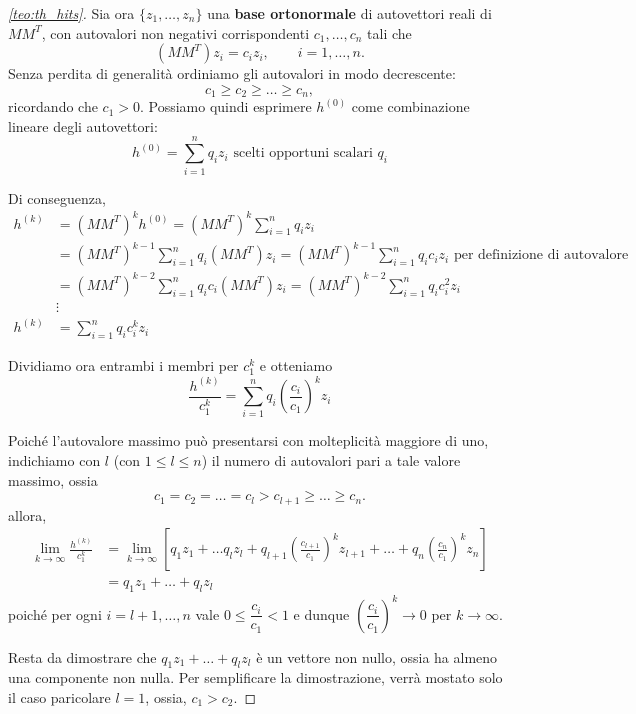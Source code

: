\begin{proof}[\autoref{teo:th_hits}]
    Sia ora $\{z_1,\dots,z_n\}$ una \textbf{base ortonormale} di autovettori reali di $MM^T$, con autovalori non negativi corrispondenti $c_1,\dots,c_n$ tali che
    \[
    (MM^T) z_i = c_i z_i,\qquad i=1,\dots,n.
    \]
    Senza perdita di generalità ordiniamo gli autovalori in modo decrescente:
    \[
    c_1 \ge c_2 \ge \dots \ge c_n,
    \]
    ricordando che $c_1>0$.
    Possiamo quindi esprimere $h^{(0)}$ come combinazione lineare degli autovettori:
    \[
    h^{(0)} = \sum_{i=1}^{n} q_iz_i \text{ scelti opportuni scalari } q_i 
    \]

    Di conseguenza, 
    \begin{align*}
        h^{(k)} &= (M M^T)^k h^{(0)} = (M M^T)^k \sum_{i=1}^{n} q_iz_i \\
        &= (M M^T)^{k-1} \sum_{i=1}^{n} q_i (M M^T) z_i = (M M^T)^{k-1} \sum_{i=1}^{n} q_i c_i z_i \text{ per definizione di autovalore} \\
        &= (M M^T)^{k-2} \sum_{i=1}^{n} q_i c_i (M M^T) z_i = (M M^T)^{k-2} \sum_{i=1}^{n} q_i c_i^2 z_i \\
        &\vdots \\
        h^{(k)} &= \sum_{i=1}^{n} q_i c_i^k z_i
    \end{align*}

    Dividiamo ora entrambi i membri per $c_1^k$ e otteniamo
    \[
    \frac{h^{(k)}}{c_1^k} = \sum_{i=1}^{n} q_i \left(\frac{c_i}{c_1} \right)^k z_i
    \]

    Poiché l'autovalore massimo può presentarsi con molteplicità maggiore di uno, indichiamo con \(l\) (con \(1\le l\le n\)) il numero di autovalori pari a tale valore massimo, ossia
    \[
    c_1 = c_2 = \dots = c_l > c_{l+1} \ge \dots \ge c_n.
    \]
    allora,
    \begin{align*}
        \lim_{k \to \infty} \frac{h^{(k)}}{c_1^k} &= \lim_{k \to \infty} \left[ q_1 z_1 + \dots q_l z_l + q_{l+1}\left(\frac{c_{l+1}}{c_1} \right)^k z_{l+1} + \dots + q_{n}\left(\frac{c_{n}}{c_1} \right)^k z_{n}\right] \\
        &= q_1 z_1 + \dots + q_l z_l
    \end{align*}
    poiché per ogni \(i=l+1,\dots,n\) vale \(0\le \dfrac{c_i}{c_1}<1\) e dunque
    \(\left(\dfrac{c_i}{c_1}\right)^k\to 0\) per \(k\to\infty\). 
    
    Resta da dimostrare che $q_1 z_1 + \dots + q_l z_l$ è un vettore non nullo, ossia ha almeno una componente non nulla. Per semplificare la dimostrazione, verrà mostato solo il caso paricolare $l = 1$, ossia, $c_1 > c_2$.
    

\end{proof}
